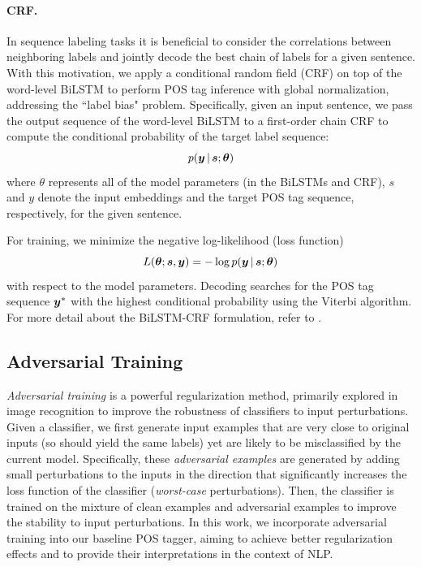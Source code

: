 \documentclass[11pt,a4paper]{article}
\newcommand{\veci}[1]{\mbox{\boldmath $#1$}}
\begin{document}
\paragraph{CRF.}
In sequence labeling tasks it is beneficial to consider the correlations between neighboring labels and jointly decode the best chain of labels for a given sentence.
With this motivation, we apply a conditional random field (CRF) \cite{lafferty:2001} on top of the word-level BiLSTM to perform POS tag inference with global normalization, addressing the ``label bias" problem.
Specifically, given an input sentence, we pass the output sequence of the word-level BiLSTM to a first-order chain CRF to compute the conditional probability of the target label sequence: 
$$p(\veci{y} \,|\, \veci{s}; \veci{\theta})$$
where \veci{\theta} represents all of the model parameters (in the BiLSTMs and CRF), \veci{s} and \veci{y} denote the input embeddings and the target POS tag sequence, respectively, for the given sentence. 

For training, we minimize the negative log-likelihood (loss function)
\begin{equation}
\label{eq:baseline_loss}
 L(\veci{\theta}; \veci{s}, \veci{y}) = - \log p(\veci{y} \,|\, \veci{s}; \veci{\theta})
\end{equation}
with respect to the model parameters.
Decoding searches for the POS tag sequence $\veci{y}^*$ with the highest conditional probability using the Viterbi algorithm.
For more detail about the BiLSTM-CRF formulation, refer to .


\subsection{Adversarial Training}
\label{sec:method:adv_training}
{\it Adversarial training} \cite{Goodfellow2015explain} is a powerful regularization method, primarily explored in
image recognition to improve the robustness of classifiers to input perturbations. 
Given a classifier, we first generate input examples that are very close to original inputs (so should yield the same labels) yet are likely to be misclassified by the current model.
Specifically, these {\it adversarial examples} %
are generated by adding small perturbations to the inputs in the direction that significantly increases the loss function
of the classifier ({\it worst-case} perturbations).
Then, the classifier is trained on the mixture of clean examples and adversarial examples to improve the stability to input perturbations.
In this work, we
incorporate adversarial training into our baseline POS tagger, aiming to achieve better regularization effects and to provide their interpretations in the context of NLP.
\end{document}

